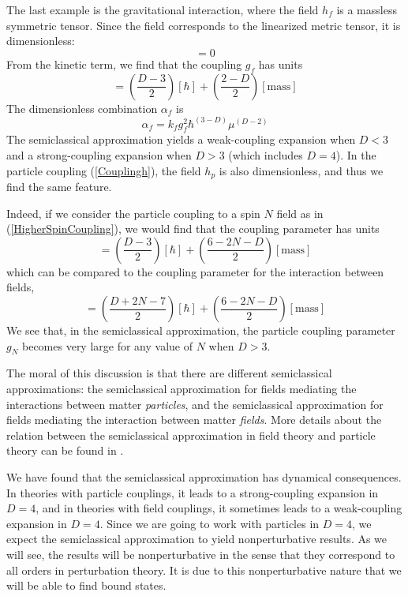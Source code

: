 The last example is the gravitational interaction, where the field $h_{f}$ is a massless symmetric tensor. Since the field corresponds to the linearized metric tensor, it is dimensionless:
\begin{equation}
	[h_{f}] = 0
\end{equation}
From the kinetic term, we find that the coupling $g_{f}$ has units
\begin{equation}
	[g_{f}] = \left( \frac{D - 3}{2} \right) [\hbar] + \left( \frac{2 - D}{2} \right) [\text{mass}]
\end{equation}
The dimensionless combination $\alpha_{f}$ is
\begin{equation}
	\alpha_{f} = k_{f} g^{2}_{f} \hbar^{(3 - D)} \mu^{(D - 2)}
\end{equation}
The semiclassical approximation yields a weak-coupling expansion when $D < 3$ and a strong-coupling expansion when $D > 3$ (which includes $D = 4$). In the particle coupling (\ref{Couplingh}), the field $h_{p}$ is also dimensionless, and thus we find the same feature.

Indeed, if we consider the particle coupling to a spin $N$ field as in (\ref{HigherSpinCoupling}), we would find that the coupling parameter has units
\begin{equation}
	[g_{N}] = \left( \frac{D - 3}{2} \right) [\hbar] + \left( \frac{6 - 2N - D}{2} \right) [\text{mass}]
\end{equation}
which can be compared to the coupling parameter for the interaction between fields,
\begin{equation}
	[f_{N}] = \left( \frac{D + 2N - 7}{2} \right) [\hbar] + \left( \frac{6 - 2N - D}{2} \right) [\text{mass}]
\end{equation}
We see that, in the semiclassical approximation, the particle coupling parameter $g_{N}$ becomes very large for any value of $N$ when $D > 3$.

The moral of this discussion is that there are different semiclassical approximations: the semiclassical approximation for fields mediating the interactions between matter \textit{particles}, and the semiclassical approximation for fields mediating the interaction between matter \textit{fields}. More details about the relation between the semiclassical approximation in field theory and particle theory can be found in \cite{HalpernSiegel}.

We have found that the semiclassical approximation has dynamical consequences. In theories with particle couplings, it leads to a strong-coupling expansion in $D = 4$, and in theories with field couplings, it sometimes leads to a weak-coupling expansion in $D = 4$. Since we are going to work with particles in $D = 4$, we expect the semiclassical approximation to yield nonperturbative results. As we will see, the results will be nonperturbative in the sense that they correspond to all orders in perturbation theory. It is due to this nonperturbative nature that we will be able to find bound states.